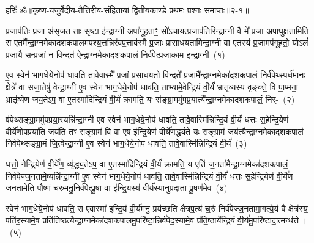 {\anuvakamend[{नामा॒ग्निः सꣳ शव॑सो॒ रक्ष॑माणा धी॒र्या॑चि॒देका॒न्नप॑ञ्चा॒शच्च॑}]}%

{हरिः॑ ॐ}{॥कृष्ण-यजुर्वेदीय-तैत्तिरीय-संहितायां द्वितीयकाण्डे प्रथमः प्रश्नः समाप्तः॥२-१॥}

\setcounter{anuvakam}{0}
प्र॒जा\-प॑तिः प्र॒जा अ॑सृजत॒ ताः सृ॒ष्टा इ॑न्द्रा॒ग्नी अपा॑गूहता॒ꣳ॒ सो॑\-ऽचायत्प्र॒जा\-प॑तिरिन्द्रा॒ग्नी वै मे᳚ प्र॒जा अपा॑घुक्षता॒मिति॒ स ए॒तमै᳚न्द्रा॒ग्नमेका॑\-दश\-कपालमपश्य॒त्तन्निर॑वप॒त्ताव॑स्मै प्र॒जाः प्रासा॑धयतामिन्द्रा॒ग्नी वा ए॒तस्य॑ प्र॒जामप॑गूहतो॒ यो\-ऽलं॑ प्र॒जायै॒ सन्प्र॒जां न वि॒न्दत॑ ऐन्द्रा॒ग्नमेका॑\-दश\-कपालं॒ निर्व॑पेत्प्र॒जाका॑म इन्द्रा॒ग्नी~(१)

ए॒व स्वेन॑ भाग॒धेये॒नोप॑ धावति॒ तावे॒वास्मै᳚ प्र॒जां प्रसा॑धयतो वि॒न्दते᳚ प्र॒जामै᳚न्द्रा॒ग्नमेका॑\-दश\-कपालं॒ निर्व॑पे॒थ्स्पर्ध॑मानः॒ क्षेत्रे॑ वा सजा॒तेषु॑ वेन्द्रा॒ग्नी ए॒व स्वेन॑ भाग॒धेये॒नोप॑ धावति॒ ताभ्या॑मे॒वेन्द्रि॒यं वी॒र्यं॑ भ्रातृ॑व्यस्य वृङ्क्ते॒ वि पा॒प्मना॒ भ्रातृ॑व्येण जय॒ते\-ऽप॒ वा ए॒तस्मा॑दिन्द्रि॒यं वी॒र्यं॑ क्रामति॒ यः स॑ङ्ग्रा॒ममु॑पप्र॒यात्यै᳚न्द्रा॒ग्नमेका॑\-दश\-कपालं॒ निर्-~(२)

व॑पेथ्सङ्ग्रा॒ममु॑पप्रया॒स्यन्नि॑न्द्रा॒ग्नी ए॒व स्वेन॑ भाग॒धेये॒नोप॑ धावति॒ तावे॒वास्मि॑न्निन्द्रि॒यं वी॒र्यं॑ धत्तः स॒हेन्द्रि॒येण॑ वी॒र्ये॑णोप॒प्रया॑ति॒ जय॑ति॒ तꣳ स॑ङ्ग्रा॒मं वि वा ए॒ष इ॑न्द्रि॒येण॑ वी॒र्ये॑णर्द्ध्यते॒ यः स॑ङ्ग्रा॒मं जय॑त्यैन्द्रा॒ग्नमेका॑\-दश\-कपालं॒ निर्व॑पेथ्सङ्ग्रा॒मं जि॒त्वेन्द्रा॒ग्नी ए॒व स्वेन॑ भाग॒धेये॒नोप॑ धावति॒ तावे॒वास्मि॑न्निन्द्रि॒यं वी॒र्यं॑~(३)

धत्तो॒ नेन्द्रि॒येण॑ वी॒र्ये॑ण॒ व्यृ॑द्ध्य॒ते\-ऽप॒ वा ए॒तस्मा॑दिन्द्रि॒यं वी॒र्यं॑ क्रामति॒ य एति॑ ज॒नता॑मैन्द्रा॒ग्नमेका॑\-दश\-कपालं॒ निर्व॑पेज्ज॒नता॑\-मे॒ष्यन्नि॑न्द्रा॒ग्नी ए॒व स्वेन॑ भाग॒धेये॒नोप॑ धावति॒ तावे॒वास्मि॑न्निन्द्रि॒यं वी॒र्यं॑ धत्तः स॒हेन्द्रि॒येण॑ वी॒र्ये॑ण ज॒नता॑मेति पौ॒ष्णं च॒रुमनु॒निर्व॑पेत्पू॒षा वा इ॑न्द्रि॒यस्य॑ वी॒र्य॑स्यानुप्रदा॒ता पू॒षण॑मे॒व~(४)

स्वेन॑ भाग॒धेये॒नोप॑ धावति॒ स ए॒वास्मा॑ इन्द्रि॒यं वी॒र्य॑मनु॒ प्रय॑च्छति क्षैत्रप॒त्यं च॒रुं निर्व॑पेज्ज॒नता॑मा॒गत्ये॒यं वै क्षेत्र॑स्य॒ पति॑र॒स्यामे॒व प्रति॑तिष्ठत्यैन्द्रा॒ग्नमेका॑\-दश\-कपालमु॒परि॑ष्टा॒\-न्निर्व॑पेद॒स्यामे॒व प्र॑ति॒ष्ठाये᳚न्द्रि॒यं वी॒र्य॑मु॒परि॑ष्टादा॒त्मन्ध॑त्ते॥~(५)

